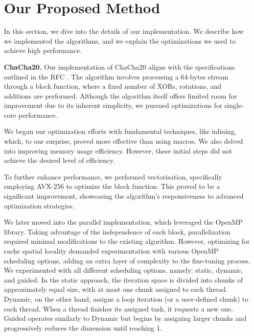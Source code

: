 \documentclass[letterpaper]{article}
\newcommand{\mypar}[1]{{\bf #1.}}
\begin{document}
\section{Our Proposed Method}\label{sec:yourmethod}
In this section, we dive into the details of our implementation. We describe how we implemented the algorithms,
and we explain the optimizations we used to achieve high performance.
%
%

\mypar{ChaCha20}
Our implementation of ChaCha20 aligns with the specifications outlined in the RFC \cite{rfcchacha}. The algorithm involves processing a 64-bytes stream through a block function, where a fixed number of XORs, rotations, and additions are performed. Although the algorithm itself offers limited room for improvement due to its inherent simplicity, we pursued optimizations for single-core performance. 

We began our optimization efforts with fundamental techniques, like inlining, which, to our surprise, proved more effective than using macros. We also delved into improving memory usage efficiency. However, these initial steps did not achieve the desired level of efficiency.

To further enhance performance, we performed vectorisation, specifically employing AVX-256 to optimize the block function. This proved to be a significant improvement, showcasing the algorithm's responsiveness to advanced optimization strategies.

We later moved into the parallel implementation, which leveraged the OpenMP library. Taking advantage of the independence of each block, parallelization required minimal modifications to the existing algorithm. However, optimizing for cache spatial locality demanded experimentation with various OpenMP scheduling options, adding an extra layer of complexity to the fine-tuning process.
We experimented with all different scheduling options, namely: static, dynamic, and guided. In the static approach, the iteration space is divided into chunks of approximately equal size, with at most one chunk assigned to each thread. Dynamic, on the other hand, assigns a loop iteration (or a user-defined chunk) to each thread. When a thread finishes its assigned task, it requests a new one. Guided operates similarly to Dynamic but begins by assigning larger chunks and progressively reduces the dimension until reaching 1.
\end{document}
